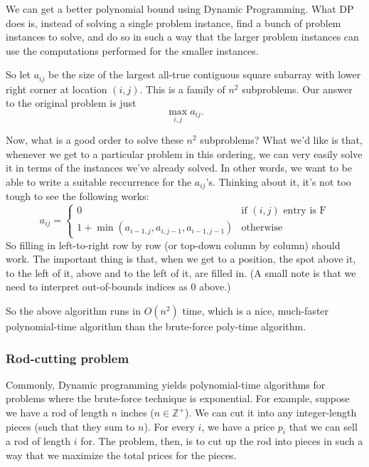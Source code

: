 \documentclass{article}
\newcommand{\Z}{\mathbb{Z}}
\begin{document}
We can get a better polynomial bound using Dynamic Programming.
What DP does is, instead of solving a single problem instance, find a bunch
of problem instances to solve, and do so in such a way that the larger
problem instances can use the computations performed for the smaller
instances.

So let $a_{ij}$ be the size of the largest all-true contiguous
square subarray with lower right corner
at location $(i,j)$.
This is a family of $n^2$ subproblems.
Our answer to the original problem is just
$$
\max_{i,j} a_{ij}.
$$

Now, what is a good order to solve these $n^2$ subproblems?
What we'd like is that, whenever we get to a particular problem
in this ordering, we can very easily solve it in terms of the instances
we've already solved.
In other words, we want to be able to write a suitable reccurrence for
the $a_{ij}$'s.
Thinking about it, it's not too tough to see the following works:
\begin{equation}
a_{ij} = 
\left\{
\begin{array}{ll}
0 & \textrm{if } (i,j) \textrm{ entry is F}
\\
1 + \min(a_{i-1,j}, a_{i,j-1}, a_{i-1,j-1}) & \textrm{otherwise}
\end{array}
\right.
\end{equation}
So filling in left-to-right row by row (or top-down column by column) should
work.
The important thing is that, when we get to a position, 
the spot above it, to the left of it, above and to the left of it, are
filled in.
(A small note is that we need to interpret out-of-bounds indices as 0 above.)

So the above algorithm runs in $O(n^2)$ time, which is a nice,
much-faster polynomial-time algorithm than the brute-force poly-time algorithm.

\subsubsection{Rod-cutting problem}

Commonly, Dynamic programming yields polynomial-time algorithms for
problems where the brute-force technique is exponential.
For example, suppose we have a rod of length $n$ inches ($n\in \Z^+$).
We can cut it into any integer-length pieces (such that they sum to $n$).
For every $i$, we have a price $p_i$ that we can sell a rod of length $i$
for.
The problem, then, is to cut up the rod into pieces in such a way that
we maximize the total prices for the pieces.
\end{document}
